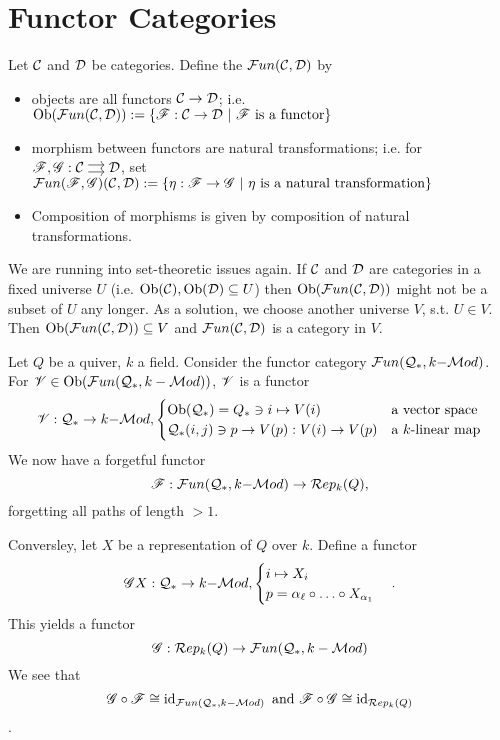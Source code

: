 \section{Functor Categories}
\begin{defn}
  Let $\mathcal{C}$ and $\mathcal{D}$ be categories. Define the  $\mathcal{F}un(\mathcal{C},\mathcal{D})$ by
  \begin{itemize}
    \item objects are all functors $\mathcal{C}\to \mathcal{D}$; i.e. $\text{Ob}(\mathcal{F}un(\mathcal{C},\mathcal{D})) := \{ \mathscr{F}:\mathcal{C}\to \mathcal{D}~|~ \mathscr{F}\text{ is a functor}\}$
    \item morphism between functors are natural transformations; i.e. for $\ffunc,\gfunc :\begin{tikzcd}[cramped, sep=small] \ccat\ar[shift left]{r}\ar[shift right]{r}&\dcat\end{tikzcd}$, set $\mathcal{F}un(\mathscr{F},\mathscr{G})(\mathcal{C},\mathcal{D}):= \{ \eta:\mathscr{F} \to \mathscr{G}~|~ \eta\text{ is a natural transformation}\}$
    \item Composition of morphisms is given by composition of natural transformations.
  \end{itemize}
\end{defn}

\begin{rem}
  We are running into set-theoretic issues again. If $\mathcal{C}$ and $\mathcal{D}$ are categories in a fixed universe $U$ (i.e. $\text{Ob}(\mathcal{C}),\text{Ob}(\mathcal{D})\subseteq U$) then $\text{Ob}(\mathcal{F}un(\mathcal{C},\mathcal{D}))$ might not be a subset of $U$ any longer. As a solution, we choose another universe $V$, s.t. $U\in V$. Then $\text{Ob}(\mathcal{F}un(\mathcal{C},\mathcal{D}))\subseteq V$ and $\mathcal{F}un(\mathcal{C},\mathcal{D})$ is a category in $V$.
\end{rem}

\begin{bsp}
  Let $Q$ be a quiver, $k$ a field. Consider the functor category $\mathcal{F}un(\mathcal{Q}_{\ast},k\mathrm{-}\mathcal{M}od)$. For $\mathscr{V}\in \text{Ob}(\mathcal{F}un(\mathcal{Q}_{\ast},k-\mathcal{M}od))$, $\mathscr{V}$ is a functor
  \[
  \mathscr{V}:\mathcal{Q}_{\ast}\to k\mathrm{-}\mathcal{M}od,\begin{cases}\text{Ob}(\mathcal{Q}_{\ast})=Q_{\ast}\ni i\mapsto V(i)&\text{a vector space}\\
  \mathcal{Q}_{\ast}(i,j)\ni p\to V(p):V(i)\to V(p)&\text{a }k\text{-linear map}\end{cases}
  \]
  We now have a forgetful functor
  \[
  \mathscr{F}:\mathcal{F}un(\mathcal{Q}_{\ast},k\mathrm{-}\mathcal{M}od)\to \mathcal{R}ep_k(Q),
  \]
  forgetting all paths of length $>1$. \par
  Conversley, let $X$ be a representation of $Q$ over $k$. Define a functor
  \[
  \mathscr{G} X: \mathcal{Q}_{\ast}\to k\mathrm{-}\mathcal{M}od, \begin{cases}i\mapsto X_i\\p=\alpha_{\ell}\circ \hdots \circ X_{\alpha_1}\end{cases}.
  \]
  This yields a functor
  \[
  \mathscr{G}:\mathcal{R}ep_k(Q)\to \mathcal{F}un(\mathcal{Q}_{\ast},k-\mathcal{M}od)
  \]
  We see that
  \[
  \mathscr{G} \circ \mathscr{F} \cong \operatorname{id}_{\mathcal{F}un(\mathcal{Q}_{\ast},k\mathrm{-}\mathcal{M}od)}\text{ and }\mathscr{F}\circ\mathscr{G}\cong \operatorname{id}_{\mathcal{R}ep_k(Q)}\].
\end{bsp}

